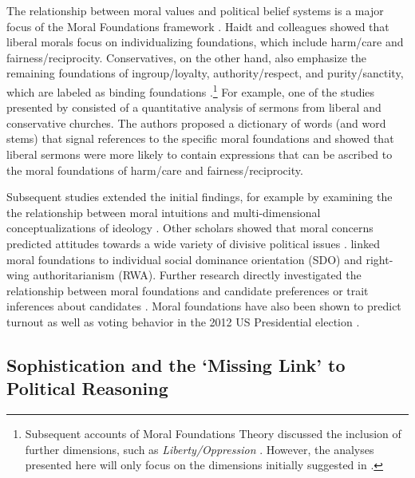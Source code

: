 \documentclass[12pt]{article}
\begin{document}
The relationship between moral values and political belief systems is a major focus of the Moral Foundations framework \citep[c.f.][]{haidt2012righteous}. Haidt and colleagues showed that liberal morals focus on individualizing foundations, which include harm/care and fairness/reciprocity. Conservatives, on the other hand, also emphasize the remaining foundations of ingroup/loyalty, authority/respect, and purity/sanctity, which are labeled as binding foundations \citep{haidt2007morality,graham2009liberals}.\footnote{Subsequent accounts of Moral Foundations Theory discussed the inclusion of further dimensions, such as \textit{Liberty/Oppression} \citep[c.f.][]{graham2013moral,haidt2012righteous}. However, the analyses presented here will only focus on the dimensions initially suggested in \citet{haidt2008moral}.} For example, one of the studies presented by \citet{graham2009liberals} consisted of a quantitative analysis of sermons from liberal and conservative churches. The authors proposed a dictionary of words (and word stems) that signal references to the specific moral foundations and showed that liberal sermons were more likely to contain expressions that can be ascribed to the moral foundations of harm/care and fairness/reciprocity.

Subsequent studies extended the initial findings, for example by examining the the relationship between moral intuitions and multi-dimensional conceptualizations of ideology \citep[c.f.][]{haidt2009above}.  Other scholars showed that moral concerns predicted attitudes towards a wide variety of divisive political issues \citep[e.g.][]{koleva2012tracing,low2015moral}. \citet{federico2013mapping} linked moral foundations to individual social dominance orientation (SDO) and right-wing authoritarianism (RWA). Further research directly investigated the relationship between moral foundations and candidate preferences \citep{iyer2010beyond} or trait inferences about candidates \citep{clifford2014linking}. Moral foundations have also been shown to predict turnout \citep{johnson2014ideology} as well as voting behavior in the 2012 US Presidential election \citep{franks2015using}.


\subsection{Sophistication and the `Missing Link' to Political Reasoning}
\end{document}
